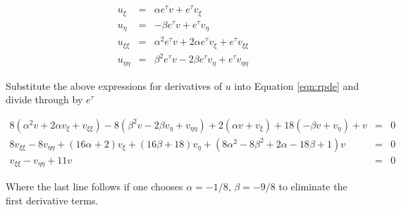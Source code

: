 \documentclass[a4paper,12pt]{article}
\begin{document}
\begin{eqnarray}
u_{\xi} &=& \alpha e^{\tau}v + e^{\tau}v_{\xi}\nonumber\\
u_{\eta} &=& -\beta e^{\tau}v + e^{\tau}v_{\eta}\nonumber\\
u_{\xi\xi} &=& \alpha^2e^{\tau}v + 2\alpha e^{\tau}v_{\xi} + e^{\tau}v_{\xi\xi}\nonumber\\
u_{\eta\eta} &=& \beta^2e^{\tau}v - 2\beta e^{\tau}v_{\eta} + e^{\tau}v_{\eta\eta}\nonumber
\end{eqnarray}

Substitute the above expressions for derivatives of $u$ into Equation \ref{eqn:rpde} and divide through by $e^{\tau}$

\begin{eqnarray}
8(\alpha^2v + 2\alpha v_{\xi} + v_{\xi\xi}) - 8(\beta^2v - 2\beta v_{\eta} + v_{\eta\eta}) + 2(\alpha v + v_{\xi}) + 18(-\beta v + v_{\eta}) + v &=& 0\nonumber\\
8v_{\xi\xi} - 8v_{\eta\eta} + (16\alpha + 2)v_{\xi} + (16\beta + 18)v_{\eta} + (8\alpha^2 - 8\beta^2 + 2\alpha - 18\beta + 1)v &=& 0\nonumber\\
v_{\xi\xi} - v_{\eta\eta} + 11v &=& 0\nonumber
\end{eqnarray}

Where the last line follows if one chooses $\boxed{\alpha = -1/8,\,\beta = -9/8}$ to eliminate the first derivative terms.
\end{document}
